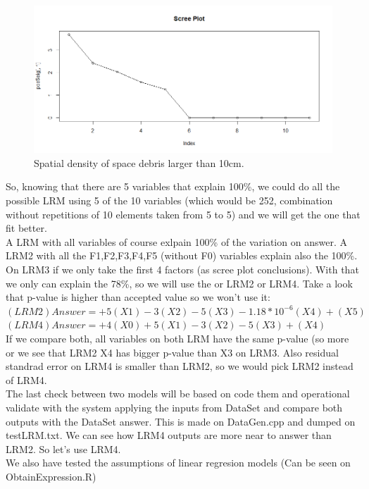 \documentclass[12pt]{article}
\begin{document}
\begin{figure}[!htb]
    \centering
\includegraphics[scale=0.5]{screeploot.png}
    \caption{Spatial density of space debris larger than 10cm.} 
    \label{bottom}
\end{figure} 
\newpage
So, knowing that there are 5 variables that explain 100\%, we could do all the possible LRM using 5 of the 10 variables (which would be 252, combination without repetitions of 10 elements taken from 5 to 5) and we will get the one that fit better. \\

A LRM with all variables of course exlpain 100\% of the variation on answer.
A LRM2 with all the F1,F2,F3,F4,F5 (without F0) variables explain also the 100\%.
On LRM3 if we only take the first 4 factors (as scree plot conclusions). With that we only can explain the 78\%, so we will use the or LRM2 or LRM4. Take a look that p-value is higher than accepted value so we won't use it:\\
$(LRM2) Answer = +5(X1)-3(X2)-5(X3)-1.18*10^{-6}(X4)+(X5)$\\
$(LRM4) Answer = +4(X0)+5(X1)-3(X2)-5(X3)+(X4)$\\

If we compare both, all variables on both LRM have the same p-value (so more or we see that LRM2 X4 has bigger p-value than X3 on LRM3. Also residual standrad error on LRM4 is smaller than LRM2, so we would pick LRM2 instead of LRM4.\\
The last check between two models will be based on code them and operational validate with the system applying the inputs from DataSet and compare both outputs with the DataSet answer. This is made on DataGen.cpp and dumped on testLRM.txt. We can see how LRM4 outputs are more near to answer than LRM2. So let's use LRM4. \\
We also have tested the assumptions of linear regresion models (Can be seen on ObtainExpression.R)\\
\end{document}
